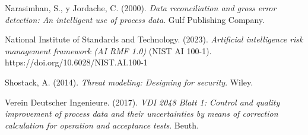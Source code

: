 \documentclass[anexo]{../../comun/overfore}
\begin{document}
\begin{referencias}
\item Narasimhan, S., y Jordache, C. (2000). \emph{Data reconciliation and gross error detection: An intelligent use of process data}. Gulf Publishing Company.
\item National Institute of Standards and Technology. (2023). \emph{Artificial intelligence risk management framework (AI RMF 1.0)} (NIST AI 100-1). https://doi.org/10.6028/NIST.AI.100-1
\item Shostack, A. (2014). \emph{Threat modeling: Designing for security}. Wiley.
\item Verein Deutscher Ingenieure. (2017). \emph{VDI 2048 Blatt 1: Control and quality improvement of process data and their uncertainties by means of correction calculation for operation and acceptance tests}. Beuth.
\end{referencias}
\end{document}
